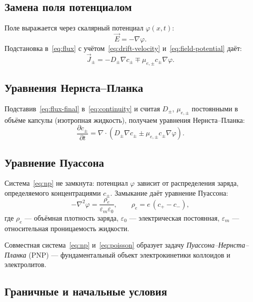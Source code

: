 \subsection*{Замена поля потенциалом}

Поле выражается через скалярный потенциал $\varphi(x, t)$:
\begin{equation}\label{eq:field-potential}
    \vec{E} = -\nabla \varphi.
\end{equation}
Подстановка в~\eqref{eq:flux} с учётом~\eqref{eq:drift-velocity}
и~\eqref{eq:field-potential} даёт:
\begin{equation}\label{eq:flux-final}
    \vec{J}_\pm = -D_\pm \nabla c_\pm \mp \mu_{e,\pm} c_\pm \nabla \varphi.
\end{equation}

\subsection*{Уравнения Нернста--Планка}

Подставив~\eqref{eq:flux-final} в~\eqref{eq:continuity} и считая $D_\pm$,
$\mu_{e,\pm}$ постоянными в объёме капсулы (изотропная жидкость), получаем
уравнения Нернста--Планка:
\begin{equation}\label{eq:np}
    \boxed{\;\frac{\partial c_\pm}{\partial t}
    = \nabla \cdot \left(D_\pm \nabla c_\pm \pm \mu_{e,\pm} c_\pm \nabla \varphi\right).\;}
\end{equation}

\subsection*{Уравнение Пуассона}

Система~\eqref{eq:np} не замкнута: потенциал $\varphi$ зависит от распределения
заряда, определяемого концентрациями $c_\pm$. Замыкание даёт уравнение
Пуассона:
\begin{equation}\label{eq:poisson}
    -\nabla^2 \varphi = \frac{\rho_e}{\varepsilon_m \varepsilon_0},
    \qquad
    \rho_e = e\,(c_+ - c_-),
\end{equation}
где $\rho_e$ — объёмная плотность заряда, $\varepsilon_0$ — электрическая
постоянная, $\varepsilon_m$ — относительная проницаемость жидкости.

Совместная система~\eqref{eq:np} и~\eqref{eq:poisson} образует задачу
\emph{Пуассона--Нернста--Планка} (PNP) — фундаментальный объект
электрокинетики коллоидов и электролитов.

\subsection*{Граничные и начальные условия}


